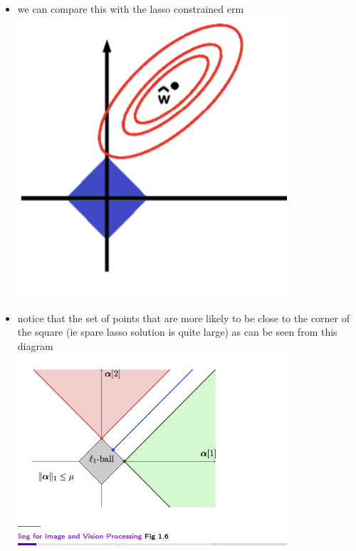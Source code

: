 \documentclass{article}
\begin{document}
\begin{itemize}
\item we can compare this with the lasso constrained erm \\\includegraphics*[width=10cm]{images/Screenshot 2023-05-10 at 10.18.06 PM.png}
\item notice that the set of points that are more likely to be close to the corner of the square (ie spare lasso solution is quite large) as can be seen from this diagram 
\\ \includegraphics*[width=10cm]{images/Screenshot 2023-05-10 at 10.17.24 PM.png}

\end{itemize}
\end{document}
